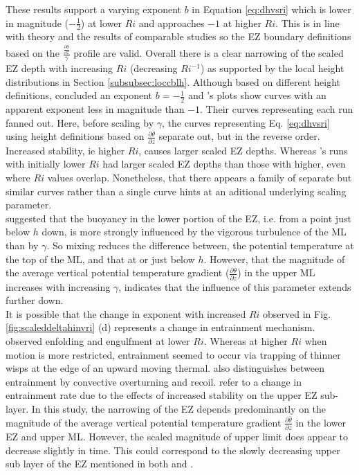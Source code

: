 \documentclass[referee]{svjour3}
\begin{document}
These results support a varying exponent $b$ in Equation \ref{eq:dhvsri} which is lower in magnitude ($-\frac{1}{2}$) at lower $Ri$ and approaches $-1$ at higher $Ri$.  This is in line with theory and the results of comparable studies so the EZ boundary definitions based on the $\frac{\frac{\partial \overline{\theta}}{\partial z}}{\gamma}$ profile are valid.  Overall there is a clear narrowing of the scaled EZ depth with increasing $Ri$ (decreasing $Ri^{-1}$) as supported by the local height distributions in Section \ref{subsubsec:loccblh}.  Although based on different height definitions, \cite{Fedorovich04} concluded an exponent $b = -\frac{1}{2}$ and \cite{Brooks12}'s plots show curves with an apparent exponent less in magnitude than $-1$.  Their curves representing each run fanned out.  Here, before scaling by $\gamma$, the curves representing Eq. \ref{eq:dhvsri} using height definitions based on $\frac{\partial \overline{\theta}}{\partial z}$ separate out, but in the reverse order.  Increased stability, ie higher $Ri$, causes larger scaled EZ depths.  Whereas \cite{Brooks12}'s runs with initially lower $Ri$ had larger scaled EZ depths than those with higher, even where $Ri$ values overlap. Nonetheless, that there appears a family of separate but similar curves rather than a single curve hints at an aditional underlying scaling parameter.\\     

\cite{Garcia14} suggested that the buoyancy in the lower portion of the EZ, i.e. from a point just below $h$ down, is more strongly influenced by the vigorous turbulence of the ML than by $\gamma$.  So mixing reduces the difference between, the potential temperature at the top of the ML, and that at or just below $h$.  However, that the magnitude of the average vertical potential temperature gradient ($\frac{\partial \overline{\theta}}{\partial z}$) in the upper ML increases with increasing $\gamma$, indicates that the influence of this parameter extends further down.\\

It is possible that the change in exponent with increased $Ri$ observed in Fig. \ref{fig:scaleddeltahinvri} (d) represents a change in entrainment mechanism. \cite{Sullivan98} observed enfolding and engulfment at lower $Ri$.  Whereas at higher $Ri$ when motion is more restricted, entrainment seemed to occur via trapping of thinner wisps at the edge of an upward moving thermal.  \cite{Turner86} also distinguishes between entrainment by convective overturning and recoil. \cite{Garcia14} refer to a change in entrainment rate due to the effects of increased stability on the upper EZ sub-layer.  In this study, the narrowing of the EZ depends predominantly on the magnitude of the average vertical potential temperature gradient $\frac{\partial \overline{\theta}}{\partial z}$ in the lower EZ and upper ML.  However, the scaled magnitude of upper limit does appear to decrease slightly in time.  This could correspond to the slowly decreasing upper sub layer of the EZ mentioned in both \cite{Garcia14} and \cite{Fedorovich04}.\\
\end{document}
